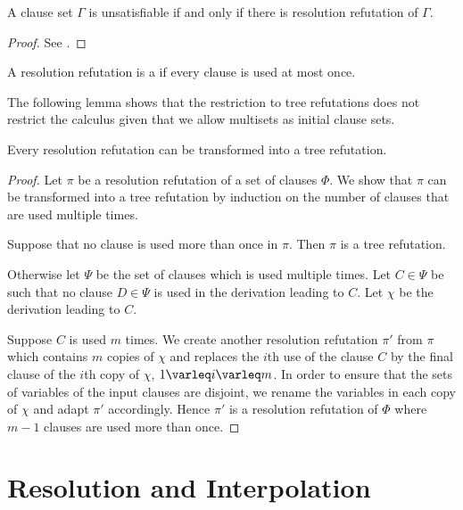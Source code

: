 \begin{samepage}
	\begin{thm}
		A clause set $\Gamma$ is unsatisfiable if and only if there is resolution refutation of $\Gamma$.
	\end{thm}
	\begin{proof}
		See \cite{Rob65}.
	\end{proof}
\end{samepage}



\begin{defi}
	A resolution refutation is a  if every clause is used at most once.
\end{defi}

The following lemma shows that the restriction to tree refutations does not restrict the calculus given that we allow multisets as initial clause sets.
\begin{lemma}
	\label{lemma:bin_tree_deduction}
	Every resolution refutation can be transformed into a tree refutation.
\end{lemma}
\begin{proof}
	Let $\pi$ be a resolution refutation of a set of clauses $\Phi$.
	We show that $\pi$ can be transformed into a tree refutation by induction on the number of clauses that are used multiple times.

	Suppose that no clause is used more than once in $\pi$. Then $\pi$ is a tree refutation.

	Otherwise let $\Psi$ be the set of clauses which is used multiple times.
	Let $C \in \Psi$ be such that no clause $D \in \Psi$ is used in the derivation leading to $C$.
	Let $\chi$ be the derivation leading to $C$.

	Suppose $C$ is used $m$ times.
	We create another resolution refutation $\pi'$ from $\pi$ which contains $m$ copies of $\chi$ and replaces the $i$th use of the clause $C$ by the final clause of the $i$th copy of $\chi$, $1 \varleq i \varleq m$.
	In order to ensure that the sets of variables of the input clauses are disjoint, we rename the variables in each copy of $\chi$ and adapt $\pi'$ accordingly.
	Hence $\pi'$ is a resolution refutation of $\Phi$ where $m-1$ clauses are used more than once.
\end{proof}


\section{Resolution and Interpolation}
\label{sec:resolution_and_interpolation}


